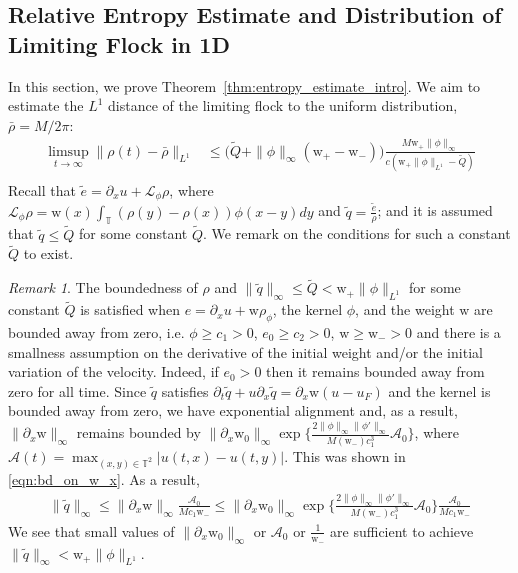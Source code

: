 \documentclass[11pt,letterpaper]{amsart}
\theoremstyle{plain}
\theoremstyle{definition}
\theoremstyle{remark}
\newtheorem{remark}[THEOREM]{Remark}
\newcommand{\thm}[1]{Theorem~\ref{#1}}
\newcommand{\T}{\ensuremath{\mathbb{T}}}   %
\def \cA {\mathcal{A}}
\def \cL {\mathcal{L}}
\renewcommand{\geq}{\geqslant}
\renewcommand{\leq}{\leqslant}
\def\T{\mathbb{T}}
\def \wt {\mathrm{w}}
\begin{document}
\subsection{Relative Entropy Estimate and Distribution of Limiting Flock in 1D}
\label{sec:entropy}
In this section, we prove \thm{thm:entropy_estimate_intro}.
We aim to estimate the $L^1$ distance of the limiting flock to the uniform distribution, $\bar{\rho} = M/2\pi$:
\begin{align*}
    \limsup_{t \to \infty} \|\rho(t) - \bar{\rho} \|_{L^1} 
        &\leq  \Big( \tilde{Q} +  \|\phi\|_{\infty} (\wt_+ - \wt_-) \Big) \frac{M \wt_+ \|\phi\|_{\infty}}{c(\wt_+ \|\phi\|_{L^1} - \tilde{Q})} \\
\end{align*}
Recall that $\tilde{e} = \partial_x u + \cL_{\phi} \rho$, where $\cL_{\phi} \rho = \wt(x) \int_{\T} (\rho(y) - \rho(x)) \phi(x-y) dy$ 
and $\tilde{q} = \frac{\tilde{e}}{\rho}$; and it is assumed that $\tilde{q} \leq \tilde{Q}$ for some constant $\tilde{Q}$. 
We remark on the conditions for such a constant $\tilde{Q}$ to exist. 
\begin{remark}
    \label{rmk:bd_on_q_tilde}
    The boundedness of $\rho$ and $\|\tilde{q}\|_{\infty} \leq \tilde{Q} < \wt_+ \|\phi\|_{L^1}$ for some constant $\tilde{Q}$ is 
    satisfied when $e = \partial_x u + \wt \rho_{\phi}$, the kernel $\phi$, and the weight $\wt$ are bounded away from zero, i.e. $\phi \geq c_1 > 0$, $e_0 \geq c_2 > 0$, 
    $\wt \geq \wt_- > 0$ and there is a smallness assumption on the derivative of the initial weight and/or the initial variation of the velocity. Indeed, 
    if $e_0 > 0$ then it remains bounded away from zero for all time. 
    Since $\tilde{q}$ satisfies $\partial_t \tilde{q} + u \partial_x \tilde{q} = \partial_x \wt (u - u_F)$
    and the kernel is bounded away from zero, 
    we have exponential alignment and, as a result, $\|\partial_x \wt\|_{\infty}$ remains bounded 
    by $\|\partial_x \wt_0\|_{\infty} \exp \Big\{ \frac{2 \|\phi\|_{\infty} \|\phi'\|_{\infty}}{M (\wt_-) c_1^3} \cA_0 \Big\}$, 
    where $\cA(t) = \max_{(x,y) \in \T^2} |u(t,x) - u(t,y)|$.  This was shown in \eqref{eqn:bd_on_w_x}. 
    As a result,
    \begin{align*}
        \|\tilde{q}\|_{\infty} \leq \| \partial_x \wt \|_{\infty}  \frac{\cA_0}{ M c_1 \wt_-}
            \leq \|\partial_x \wt_0\|_{\infty} \exp \Big\{ \frac{2 \|\phi\|_{\infty} \|\phi'\|_{\infty}}{M (\wt_-) c_1^3} \cA_0 \Big\} \frac{\cA_0}{ M c_1 \wt_-}
    \end{align*} 
    We see that small values of $\|\partial_x \wt_0\|_{\infty}$ or $\cA_0$ or $\frac{1}{\wt_-}$ are sufficient 
    to achieve $\|\tilde{q}\|_{\infty} < \wt_+ \|\phi\|_{L^1}$.
\end{remark}
\end{document}
